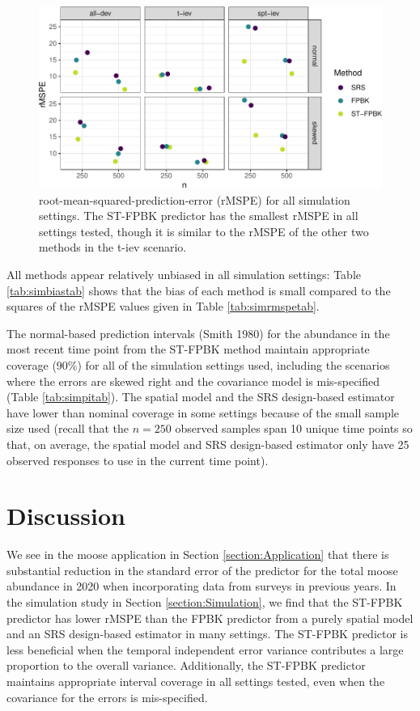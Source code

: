 \documentclass[]{article}    %
\begin{document}
\begin{figure}
\centering
\includegraphics{sim_results.pdf}
\caption{\label{fig:rmspe} root-mean-squared-prediction-error (rMSPE)
for all simulation settings. The ST-FPBK predictor has the smallest
rMSPE in all settings tested, though it is similar to the rMSPE of the
other two methods in the t-iev scenario.}
\end{figure}

All methods appear relatively unbiased in all simulation settings: Table
\ref{tab:simbiastab} shows that the bias of each method is small
compared to the squares of the rMSPE values given in Table
\ref{tab:simrmspetab}.

The normal-based prediction intervals (Smith 1980) for the abundance in
the most recent time point from the ST-FPBK method maintain appropriate
coverage (90\%) for all of the simulation settings used, including the
scenarios where the errors are skewed right and the covariance model is
mis-specified (Table \ref{tab:simpitab}). The spatial model and the SRS
design-based estimator have lower than nominal coverage in some settings
because of the small sample size used (recall that the \(n = 250\)
observed samples span 10 unique time points so that, on average, the
spatial model and SRS design-based estimator only have 25 observed
responses to use in the current time point).

\hypertarget{section:Discussion}{%
\section{Discussion}\label{section:Discussion}}

We see in the moose application in Section \ref{section:Application}
that there is substantial reduction in the standard error of the
predictor for the total moose abundance in 2020 when incorporating data
from surveys in previous years. In the simulation study in Section
\ref{section:Simulation}, we find that the ST-FPBK predictor has lower
rMSPE than the FPBK predictor from a purely spatial model and an SRS
design-based estimator in many settings. The ST-FPBK predictor is less
beneficial when the temporal independent error variance contributes a
large proportion to the overall variance. Additionally, the ST-FPBK
predictor maintains appropriate interval coverage in all settings
tested, even when the covariance for the errors is mis-specified.
\end{document}
